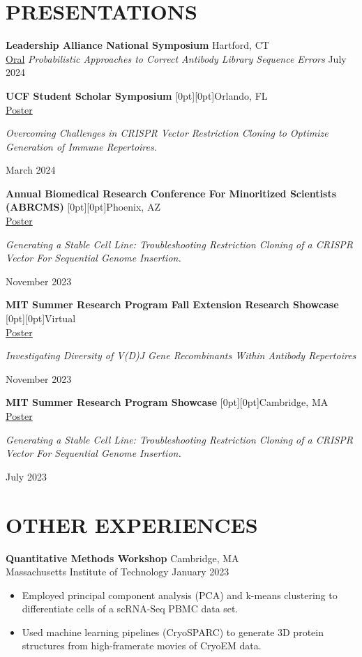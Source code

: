 \documentclass[a4paper,9pt]{extarticle}
\newcommand{\PresentationItem}[5]{
\noindent\textbf{#1} \hfill \raisebox{\dimexpr-\ht\strutbox+\dp\strutbox\relax}[0pt][0pt]{#2} \\
\underline{#3}
\indent \begin{minipage}{0.6\textwidth} 
\textit{#4} \end{minipage} \hfill #5
\bigskip}
\newcommand{\PresentationItemSmall}[5]{
\noindent\textbf{#1} \hfill #2 \\ 
\underline{#3} 
\indent \textit{#4} \hfill #5
\bigskip}
\begin{document}
\section*{PRESENTATIONS}

\PresentationItemSmall{Leadership Alliance National Symposium}{Hartford, CT}{Oral}{Probabilistic Approaches to Correct Antibody Library Sequence Errors}{July 2024}

\PresentationItem{UCF Student Scholar Symposium}{Orlando, FL}{Poster}{Overcoming Challenges in CRISPR Vector Restriction Cloning to Optimize Generation of Immune Repertoires.}{March 2024}

\PresentationItem{Annual Biomedical Research Conference For Minoritized Scientists (ABRCMS)}{Phoenix, AZ}{Poster}{Generating a Stable Cell Line: Troubleshooting Restriction Cloning of a CRISPR Vector For Sequential Genome Insertion.}{November 2023}

\PresentationItem{MIT Summer Research Program Fall Extension Research Showcase}{Virtual}{Poster}{Investigating Diversity of V(D)J Gene Recombinants Within Antibody Repertoires}{November 2023}

\PresentationItem{MIT Summer Research Program Showcase}{Cambridge, MA}{Poster}{Generating a Stable Cell Line: Troubleshooting Restriction Cloning of a CRISPR Vector For Sequential Genome Insertion.}{July 2023}







\section*{OTHER EXPERIENCES}


\noindent\textbf{Quantitative Methods Workshop} \hfill Cambridge, MA \\
Massachusetts Institute of Technology \hfill January 2023
\begin{itemize}
    \item Employed principal component analysis (PCA) and k-means clustering to differentiate cells of a scRNA-Seq PBMC data set.
    \item Used machine learning pipelines (CryoSPARC) to generate 3D protein structures from high-framerate movies of CryoEM data.
\end{itemize}
\bigskip
\end{document}
